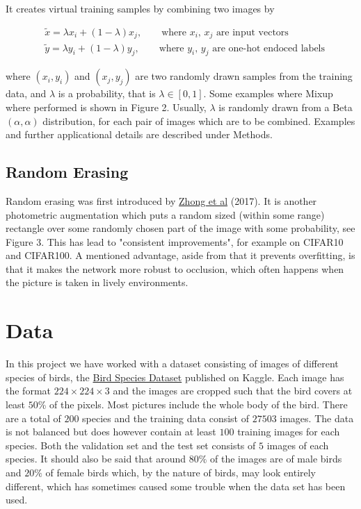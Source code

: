 \documentclass{article}
\begin{document}
It creates virtual training samples by combining two images by 

\begin{align*}
&\tilde{x} = \lambda x_i + (1-\lambda) x_j, \qquad \text{where $x_i$, $x_j$ are input vectors} \\
&\tilde{y} = \lambda y_i + (1-\lambda) y_j, \qquad \text{where $y_i$, $y_j$ are one-hot endoced labels}
\end{align*}


where $(x_i, y_i)$ and $(x_j, y_j)$ are two randomly drawn samples from the training data, and $\lambda$ 
is a probability, that is $\lambda \in [0,1]$. Some examples where Mixup where performed is shown in Figure 2.  Usually, $\lambda$ is randomly drawn from a Beta$(\alpha, \alpha)$ 
distribution, for each pair of images which are to be combined. Examples and further applicational details are described under Methods. 


\subsection{Random Erasing}
Random erasing was first introduced by \href{https://arxiv.org/pdf/1708.04896.pdf}{Zhong et al} (2017). It is another photometric augmentation which puts a random sized (within some range) rectangle over some randomly chosen part of the image with some probability, see Figure 3. This has lead to "consistent improvements", for example on CIFAR10 and CIFAR100. A mentioned advantage, aside from that it prevents overfitting, is that it makes the network more robust to occlusion, which often happens when the picture is taken in lively environments.

\section{Data}

In this project we have worked with a dataset consisting of images of different species of birds, the  
\href{https://www.kaggle.com/gpiosenka/100-bird-species}{Bird Species Dataset} published on Kaggle. Each image has the format $224 \times 224 \times 3$ and the images are cropped such that the bird covers at least $50$\% of the pixels. Most pictures include the whole body of the bird.
There are 
a total of $200$ species and the training data consist of $27503$ images. The data is not balanced but does however contain at least $100$ training images for each species. 
Both the validation set and the test set consists of $5$ images of each species. 
It should also be said that around $80\%$ of the images are of male birds and $20\%$ of female 
birds which, by the nature of birds, may look entirely different, which has sometimes caused some trouble when the data set has been used.
\end{document}
